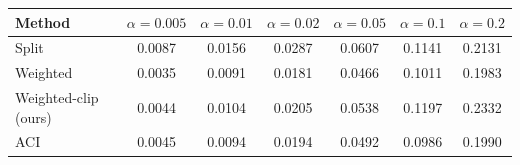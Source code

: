 \begin{tabular}{lcccccc}
\toprule
Method & $\alpha=0.005$ & $\alpha=0.01$ & $\alpha=0.02$ & $\alpha=0.05$ & $\alpha=0.1$ & $\alpha=0.2$ \\
\midrule
Split & 0.0087 & 0.0156 & 0.0287 & 0.0607 & 0.1141 & 0.2131 \\
Weighted & 0.0035 & 0.0091 & 0.0181 & 0.0466 & 0.1011 & 0.1983 \\
Weighted-clip (ours) & 0.0044 & 0.0104 & 0.0205 & 0.0538 & 0.1197 & 0.2332 \\
ACI & 0.0045 & 0.0094 & 0.0194 & 0.0492 & 0.0986 & 0.1990 \\
\bottomrule
\end{tabular}
